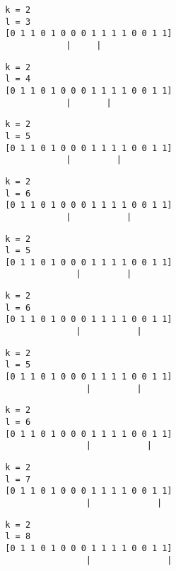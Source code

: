 { \begin{verbatim}
        k = 2
        l = 3
        [0 1 1 0 1 0 0 0 1 1 1 1 0 0 1 1]
                    |     |
\end{verbatim} }

{ \begin{verbatim}
        k = 2
        l = 4
        [0 1 1 0 1 0 0 0 1 1 1 1 0 0 1 1]
                    |       |
\end{verbatim} }

{ \begin{verbatim}
        k = 2
        l = 5
        [0 1 1 0 1 0 0 0 1 1 1 1 0 0 1 1]
                    |         |
\end{verbatim} }

{ \begin{verbatim}
        k = 2
        l = 6
        [0 1 1 0 1 0 0 0 1 1 1 1 0 0 1 1]
                    |           |
\end{verbatim} }

{ \begin{verbatim}
        k = 2
        l = 5
        [0 1 1 0 1 0 0 0 1 1 1 1 0 0 1 1]
                      |         |
\end{verbatim} }

{ \begin{verbatim}
        k = 2
        l = 6
        [0 1 1 0 1 0 0 0 1 1 1 1 0 0 1 1]
                      |           |
\end{verbatim} }

{ \begin{verbatim}
        k = 2
        l = 5
        [0 1 1 0 1 0 0 0 1 1 1 1 0 0 1 1]
                        |         |
\end{verbatim} }

{ \begin{verbatim}
        k = 2
        l = 6
        [0 1 1 0 1 0 0 0 1 1 1 1 0 0 1 1]
                        |           |
\end{verbatim} }

{ \begin{verbatim}
        k = 2
        l = 7
        [0 1 1 0 1 0 0 0 1 1 1 1 0 0 1 1]
                        |             |
\end{verbatim} }

{ \begin{verbatim}
        k = 2
        l = 8
        [0 1 1 0 1 0 0 0 1 1 1 1 0 0 1 1]
                        |               |
\end{verbatim} }

